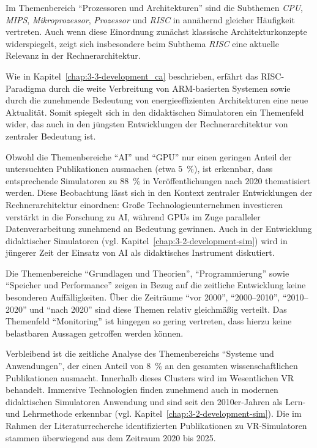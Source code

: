 Im Themenbereich \enquote{Prozessoren und Architekturen} sind die Subthemen \textit{CPU}, \textit{MIPS}, \textit{Mikroprozessor}, \textit{Prozessor} und \textit{RISC} in annähernd gleicher Häufigkeit vertreten. Auch wenn diese Einordnung zunächst klassische Architekturkonzepte widerspiegelt, zeigt sich insbesondere beim Subthema \textit{RISC} eine aktuelle Relevanz in der Rechnerarchitektur.  

Wie in Kapitel~\ref{chap:3-3-development_ca} beschrieben, erfährt das \ac{RISC}-Paradigma durch die weite Verbreitung von ARM-basierten Systemen sowie durch die zunehmende Bedeutung von energieeffizienten Architekturen eine neue Aktualität. Somit spiegelt sich in den didaktischen Simulatoren ein Themenfeld wider, das auch in den jüngsten Entwicklungen der Rechnerarchitektur von zentraler Bedeutung ist.

Obwohl die Themenbereiche \enquote{AI} und \enquote{GPU} nur einen geringen Anteil der untersuchten Publikationen ausmachen (etwa 5~\%), ist erkennbar, dass entsprechende Simulatoren zu 88~\% in Veröffentlichungen nach 2020 thematisiert werden. Diese Beobachtung lässt sich in den Kontext zentraler Entwicklungen der Rechnerarchitektur einordnen: Große Technologieunternehmen investieren verstärkt in die Forschung zu \ac{AI}, während GPUs im Zuge paralleler Datenverarbeitung zunehmend an Bedeutung gewinnen. Auch in der Entwicklung didaktischer Simulatoren (vgl. Kapitel~\ref{chap:3-2-development-sim}) wird in jüngerer Zeit der Einsatz von \ac{AI} als didaktisches Instrument diskutiert.

Die Themenbereiche \enquote{Grundlagen und Theorien}, \enquote{Programmierung} sowie \enquote{Speicher und Performance} zeigen in Bezug auf die zeitliche Entwicklung keine besonderen Auffälligkeiten. Über die Zeiträume \enquote{vor 2000}, \enquote{2000--2010}, \enquote{2010--2020} und \enquote{nach 2020} sind diese Themen relativ gleichmäßig verteilt. Das Themenfeld \enquote{Monitoring} ist hingegen so gering vertreten, dass hierzu keine belastbaren Aussagen getroffen werden können.

Verbleibend ist die zeitliche Analyse des Themenbereichs \enquote{Systeme und Anwendungen}, der einen Anteil von 8~\% an den gesamten wissenschaftlichen Publikationen ausmacht. Innerhalb dieses Clusters wird im Wesentlichen \ac{VR} behandelt. Immersive Technologien finden zunehmend auch in modernen didaktischen Simulatoren Anwendung und sind seit den 2010er-Jahren als Lern- und Lehrmethode erkennbar (vgl. Kapitel~\ref{chap:3-2-development-sim}). Die im Rahmen der Literaturrecherche identifizierten Publikationen zu \ac{VR}-Simulatoren stammen überwiegend aus dem Zeitraum 2020 bis 2025.

